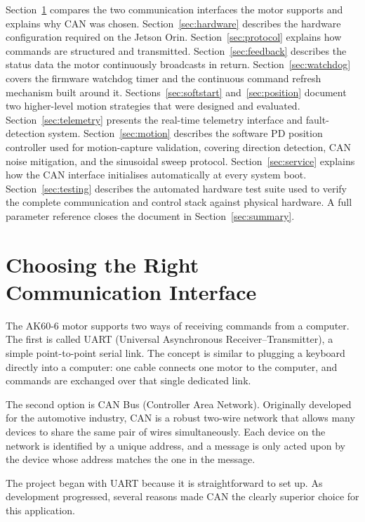 \documentclass[12pt,a4paper]{article}
\begin{document}
Section~\ref{sec:motivation} compares the two communication interfaces
the motor supports and explains why CAN was chosen.
Section~\ref{sec:hardware} describes the hardware configuration required
on the Jetson Orin.
Section~\ref{sec:protocol} explains how commands are structured and
transmitted.
Section~\ref{sec:feedback} describes the status data the motor
continuously broadcasts in return.
Section~\ref{sec:watchdog} covers the firmware watchdog timer and the
continuous command refresh mechanism built around it.
Sections~\ref{sec:softstart} and~\ref{sec:position} document two
higher-level motion strategies that were designed and evaluated.
Section~\ref{sec:telemetry} presents the real-time telemetry interface
and fault-detection system.
Section~\ref{sec:motion} describes the software PD position controller
used for motion-capture validation, covering direction detection,
CAN noise mitigation, and the sinusoidal sweep protocol.
Section~\ref{sec:service} explains how the CAN interface initialises
automatically at every system boot.
Section~\ref{sec:testing} describes the automated hardware test suite used
to verify the complete communication and control stack against physical hardware.
A full parameter reference closes the document in
Section~\ref{sec:summary}.

\section{Choosing the Right Communication Interface}
\label{sec:motivation}

The AK60-6 motor supports two ways of receiving commands from a computer.
The first is called UART (Universal Asynchronous Receiver--Transmitter),
a simple point-to-point serial link. The concept is similar to plugging
a keyboard directly into a computer: one cable connects one motor to the
computer, and commands are exchanged over that single dedicated link.

The second option is CAN Bus (Controller Area Network). Originally developed
for the automotive industry, CAN is a robust two-wire network that allows
many devices to share the same pair of wires simultaneously. Each device on
the network is identified by a unique address, and a message is only acted
upon by the device whose address matches the one in the message.

The project began with UART because it is straightforward to set up.
As development progressed, several reasons made CAN the clearly superior
choice for this application.
\end{document}
